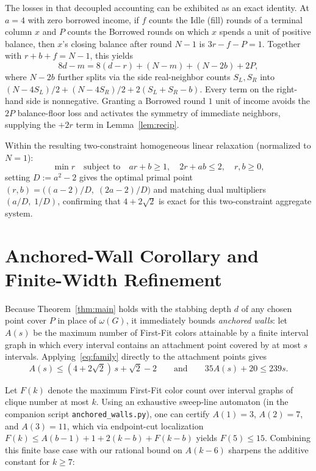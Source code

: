 \documentclass[11pt,a4paper]{article}
\theoremstyle{remark}
\begin{document}
The losses in that decoupled accounting can be exhibited as an exact identity. At $a = 4$ with zero borrowed income, if $f$ counts the Idle (fill) rounds of a terminal column $x$ and $P$ counts the Borrowed rounds on which $x$ spends a unit of positive balance, then $x$'s closing balance after round $N - 1$ is $3r - f - P = 1$. Together with $r + b + f = N - 1$, this yields
\[
  8d - m = 8(d - r) + (N - m) + (N - 2b) + 2P,
\]
where $N - 2b$ further splits via the side real-neighbor counts $S_L, S_R$ into $(N - 4S_L)/2 + (N - 4S_R)/2 + 2(S_L + S_R - b)$. Every term on the right-hand side is nonnegative. Granting a Borrowed round $1$ unit of income avoids the $2P$ balance-floor loss and activates the symmetry of immediate neighbors, supplying the $+2r$ term in Lemma~\ref{lem:recip}.

Within the resulting two-constraint homogeneous linear relaxation (normalized to $N = 1$):
\[
  \min r \quad\text{subject to}\quad ar + b \ge 1,\quad 2r + ab \le 2,\quad r, b \ge 0,
\]
setting $D := a^2 - 2$ gives the optimal primal point $(r, b) = \bigl((a - 2)/D,\; (2a - 2)/D\bigr)$ and matching dual multipliers $(a/D,\; 1/D)$, confirming that $4 + 2\sqrt{2}$ is exact for this two-constraint aggregate system.

\section{Anchored-Wall Corollary and Finite-Width Refinement}

Because Theorem~\ref{thm:main} holds with the stabbing depth $d$ of any chosen point cover $P$ in place of $\omega(G)$, it immediately bounds \emph{anchored walls}: let $A(s)$ be the maximum number of First-Fit colors attainable by a finite interval graph in which every interval contains an attachment point covered by at most $s$ intervals. Applying~\eqref{eq:family} directly to the attachment points gives
\[
  A(s) \le (4 + 2\sqrt{2})\,s + \sqrt{2} - 2 \qquad\text{and}\qquad 35A(s) + 20 \le 239s.
\]

Let $F(k)$ denote the maximum First-Fit color count over interval graphs of clique number at most $k$. Using an exhaustive sweep-line automaton (in the companion script \texttt{anchored\_walls.py}), one can certify $A(1) = 3$, $A(2) = 7$, and $A(3) = 11$, which via endpoint-cut localization $F(k) \le A(b - 1) + 1 + 2(k - b) + F(k - b)$ yields $F(5) \le 15$. Combining this finite base case with our rational bound on $A(k - 6)$ sharpens the additive constant for $k \ge 7$:
\end{document}
